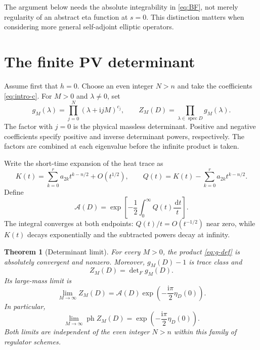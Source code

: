 \documentclass[11pt,a4paper]{article}
\newtheorem{theorem}{Theorem}[section]
\theoremstyle{remark}
\DeclareMathOperator{\spec}{spec}
\DeclareMathOperator{\ph}{ph}
\newcommand{\ii}{\mathrm i}
\newcommand{\dd}{\,\mathrm d}
\numberwithin{equation}{section}
\begin{document}
The argument below needs the absolute integrability in
\eqref{eq:BF}, not merely regularity of an abstract eta function at
$s=0$. This distinction matters when considering more general
self-adjoint elliptic operators.

\section{The finite PV determinant}\label{sec:main}

Assume first that $h=0$. Choose an even integer $N>n$ and take the
coefficients \eqref{eq:intro-c}. For $M>0$ and $\lambda\ne0$, set
\begin{equation}\label{eq:g-def}
 g_M(\lambda)=\prod_{j=0}^N(\lambda+\ii jM)^{c_j},\qquad
 Z_M(D)=\prod_{\lambda\in\spec D}g_M(\lambda).
\end{equation}
The factor with $j=0$ is the physical massless determinant. Positive
and negative coefficients specify positive and inverse determinant
powers, respectively. The factors are combined at each eigenvalue
before the infinite product is taken.

Write the short-time expansion of the heat trace as
\begin{equation}\label{eq:K-expansion}
 K(t)=\sum_{k=0}^r a_{2k}t^{k-n/2}+O(t^{1/2}),
 \qquad
 Q(t)=K(t)-\sum_{k=0}^r a_{2k}t^{k-n/2}.
\end{equation}
Define
\begin{equation}\label{eq:amplitude}
 \mathcal A(D)=
 \exp\!\left[-\frac12\int_0^\infty Q(t)\frac{\dd t}{t}\right].
\end{equation}
The integral converges at both endpoints: $Q(t)/t=O(t^{-1/2})$
near zero, while $K(t)$ decays exponentially and the subtracted
powers decay at infinity.

\begin{theorem}[Determinant limit]\label{thm:main}
For every $M>0$, the product \eqref{eq:g-def} is absolutely convergent
and nonzero. Moreover, $g_M(D)-1$ is trace class and
\begin{equation}\label{eq:fredholm}
 Z_M(D)=\det\nolimits_F g_M(D).
\end{equation}
Its large-mass limit is
\begin{equation}\label{eq:main-limit}
 \lim_{M\to\infty}Z_M(D)
 =\mathcal A(D)\exp\!\left(-\frac{\ii\pi}{2}\eta_D(0)\right).
\end{equation}
In particular,
\begin{equation}\label{eq:phase-limit}
 \lim_{M\to\infty}\ph Z_M(D)
 =\exp\!\left(-\frac{\ii\pi}{2}\eta_D(0)\right).
\end{equation}
Both limits are independent of the even integer $N>n$ within this
family of regulator schemes.
\end{theorem}
\end{document}
